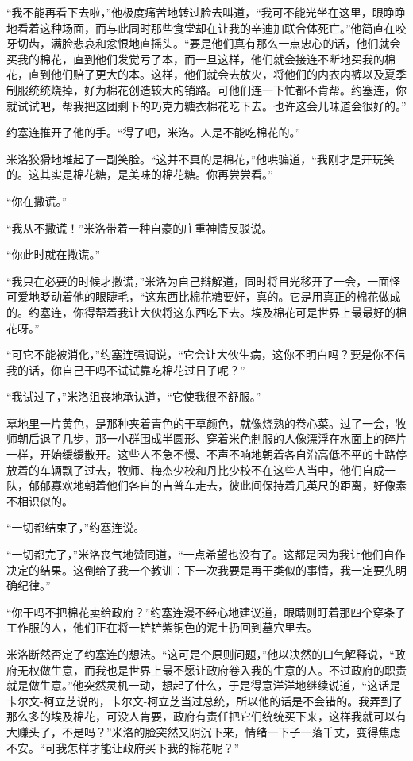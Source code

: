     “我不能再看下去啦，”他极度痛苦地转过脸去叫道，“我可不能光坐在这里，眼睁睁地看着这种场面，而与此同时那些食堂却在让我的辛迪加联合体死亡。”他简直在咬牙切齿，满脸悲哀和忿恨地直摇头。“要是他们真有那么一点忠心的话，他们就会买我的棉花，直到他们发觉亏了本，而一旦这样，他们就会接连不断地买我的棉花，直到他们赔了更大的本。这样，他们就会去放火，将他们的内衣内裤以及夏季制服统统烧掉，好为棉花创造较大的销路。可他们连一下忙都不肯帮。约塞连，你就试试吧，帮我把这团剩下的巧克力糖衣棉花吃下去。也许这会儿味道会很好的。”

    约塞连推开了他的手。“得了吧，米洛。人是不能吃棉花的。”

    米洛狡猾地堆起了一副笑脸。“这并不真的是棉花，”他哄骗道，“我刚才是开玩笑的。这其实是棉花糖，是美味的棉花糖。你再尝尝看。”

    “你在撒谎。”

    “我从不撒谎！”米洛带着一种自豪的庄重神情反驳说。

    “你此时就在撒谎。”

    “我只在必要的时候才撒谎，”米洛为自己辩解道，同时将目光移开了一会，一面怪可爱地眨动着他的眼睫毛，“这东西比棉花糖要好，真的。它是用真正的棉花做成的。约塞连，你得帮着我让大伙将这东西吃下去。埃及棉花可是世界上最最好的棉花呀。”

    “可它不能被消化，”约塞连强调说，“它会让大伙生病，这你不明白吗？要是你不信我的话，你自己干吗不试试靠吃棉花过日子呢？”

    “我试过了，”米洛沮丧地承认道，“它使我很不舒服。”

    墓地里一片黄色，是那种夹着青色的干草颜色，就像烧熟的卷心菜。过了一会，牧师朝后退了几步，那一小群围成半圆形、穿着米色制服的人像漂浮在水面上的碎片一样，开始缓缓散开。这些人不急不慢、不声不响地朝着各自沿高低不平的土路停放着的车辆飘了过去，牧师、梅杰少校和丹比少校不在这些人当中，他们自成一队，郁郁寡欢地朝着他们各自的吉普车走去，彼此间保持着几英尺的距离，好像素不相识似的。

    “一切都结束了，”约塞连说。

    “一切都完了，”米洛丧气地赞同道，“一点希望也没有了。这都是因为我让他们自作决定的结果。这倒给了我一个教训：下一次我要是再干类似的事情，我一定要先明确纪律。”

    “你干吗不把棉花卖给政府？”约塞连漫不经心地建议道，眼睛则盯着那四个穿条子工作服的人，他们正在将一铲铲紫铜色的泥土扔回到墓穴里去。

    米洛断然否定了约塞连的想法。“这可是个原则问题，”他以决然的口气解释说，“政府无权做生意，而我也是世界上最不愿让政府卷入我的生意的人。不过政府的职责就是做生意。”他突然灵机一动，想起了什么，于是得意洋洋地继续说道，“这话是卡尔文-柯立芝说的，卡尔文-柯立芝当过总统，所以他的话是不会错的。我弄到了那么多的埃及棉花，可没人肯要，政府有责任把它们统统买下来，这样我就可以有大赚头了，不是吗？”米洛的脸突然又阴沉下来，情绪一下子一落千丈，变得焦虑不安。“可我怎样才能让政府买下我的棉花呢？”

